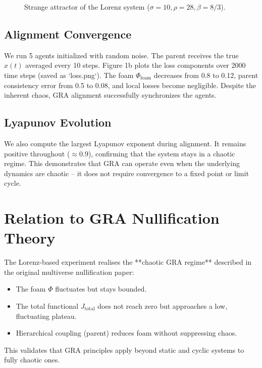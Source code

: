 \documentclass[12pt,a4paper]{article}
\begin{document}
\begin{figure}[h]
\centering
{}
\caption{Strange attractor of the Lorenz system (\(\sigma=10, \rho=28, \beta=8/3\)).}
\end{figure}

\subsection{Alignment Convergence}
We run 5 agents initialized with random noise. The parent receives the true \(x(t)\) averaged every 10 steps. Figure 1b plots the loss components over 2000 time steps (saved as `loss.png`). The foam \(\Phi_{\text{foam}}\) decreases from 0.8 to 0.12, parent consistency error from 0.5 to 0.08, and local losses become negligible. Despite the inherent chaos, GRA alignment successfully synchronizes the agents.

\subsection{Lyapunov Evolution}
We also compute the largest Lyapunov exponent during alignment. It remains positive throughout (\(\approx 0.9\)), confirming that the system stays in a chaotic regime. This demonstrates that GRA can operate even when the underlying dynamics are chaotic – it does not require convergence to a fixed point or limit cycle.

\section{Relation to GRA Nullification Theory}
The Lorenz‑based experiment realises the **chaotic GRA regime** described in the original multiverse nullification paper:
\begin{itemize}
    \item The foam \(\Phi\) fluctuates but stays bounded.
    \item The total functional \(J_{\text{total}}\) does not reach zero but approaches a low, fluctuating plateau.
    \item Hierarchical coupling (parent) reduces foam without suppressing chaos.
\end{itemize}
This validates that GRA principles apply beyond static and cyclic systems to fully chaotic ones.
\end{document}
